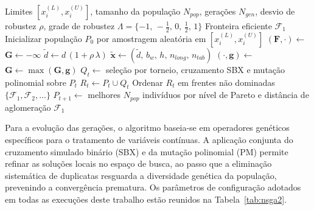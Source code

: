  \begin{algorithm}[!ht]
 \caption{Otimização robusta multiobjetivo via NSGA-II}
 \label{alg:nsga2}
 \begin{algorithmic}[1]
 \Require Limites $[x_i^{(L)}, x_i^{(U)}]$, tamanho da população $N_{pop}$, gerações $N_{gen}$, desvio de robustez $\rho$, grade de robustez $\Lambda = \{-1,\,-\tfrac{1}{2},\,0,\,\tfrac{1}{2},\,1\}$
 \Ensure Fronteira eficiente $\mathcal{F}_1$
 \State Inicializar população $P_0$ por amostragem aleatória em $[x_i^{(L)}, x_i^{(U)}]$
     \State $(\mathbf{F}, \cdot) \gets$  
     \State $\mathbf{G} \gets -\boldsymbol{\infty}$
      
       \State $\tilde{d} \gets d\,(1 + \rho\,\lambda)$
       \State $\tilde{\mathbf{x}} \gets (\tilde{d},\,b_w,\,h,\,n_{long},\,n_{tab})$
       \State $(\cdot, \mathbf{g}) \gets$ 
       \State $\mathbf{G} \gets \max(\mathbf{G}, \mathbf{g})$ 
     \EndFor
   \EndFor
   \State $Q_t \gets$ seleção por torneio, cruzamento SBX e mutação polinomial sobre $P_t$
   \State $R_t \gets P_t \cup Q_t$
   \State Ordenar $R_t$ em frentes não dominadas $\{\mathcal{F}_1, \mathcal{F}_2, \ldots\}$
   \State $P_{t+1} \gets$ melhores $N_{pop}$ indivíduos por nível de Pareto e distância de aglomeração
 \EndFor
 \State \Return $\mathcal{F}_1$
 \end{algorithmic}
 \end{algorithm}

Para a evolução das gerações, o algoritmo baseia-se em operadores genéticos específicos para o tratamento de variáveis contínuas.
A aplicação conjunta do cruzamento simulado binário (SBX) e da mutação polinomial (PM) permite refinar as soluções locais no espaço de busca, ao passo que a eliminação sistemática de duplicatas resguarda a diversidade genética da população, prevenindo a convergência prematura.
Os parâmetros de configuração adotados em todas as execuções deste trabalho estão reunidos na Tabela~\ref{tab:nsga2}.


